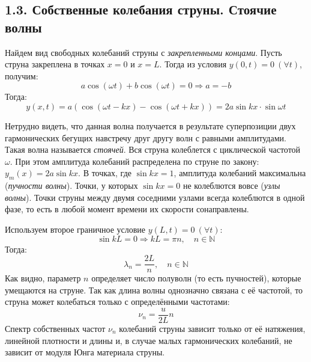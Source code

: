 \documentclass[a4paper]{article}
\begin{document}
\subsection*{1.3. Собственные колебания струны. Стоячие волны} 

\noindent
Найдем вид свободных колебаний струны с \textit{закрепленными концами}. Пусть струна закреплена в точках $x = 0$ и $x = L$. Тогда из условия $y(0, t) = 0 \ (\forall t)$, получим:
\begin{equation}
a \cos(\omega t) + b \cos(\omega t) = 0 \Rightarrow a = -b
\end{equation} 
Тогда:
\begin{equation}\label{eq9}
y(x,t) = a(\cos(\omega t - k x) - \cos(\omega t + k x)) = 2 a \sin{kx} \cdot \sin{\omega t}
\end{equation}

\noindent
Нетрудно видеть, что данная волна получается в результате суперпозиции двух гармонических бегущих навстречу друг другу волн с равными амплитудами. Такая волна называется \textit{стоячей}. Вся струна колеблется с циклической частотой $\omega$. При этом амплитуда колебаний распределена по струне по закону: $y_m(x) = 2 a \sin{kx}$. В точках, где $\sin{kx} = 1$, амплитуда колебаний максимальна (\textit{пучности волны}). Точки, у которых $\sin{kx} = 0$ не колеблются вовсе (\textit{узлы волны}). Точки струны между двумя соседними узлами всегда колеблются в одной фазе, то есть в любой момент времени их скорости сонаправлены.

\noindent
Используем второе граничное условие $y(L, t) = 0 \ (\forall t)$:
\begin{equation}
\sin{kL} = 0 \Rightarrow kL = \pi n, \quad n \in \mathbb {N} 
\end{equation}
Тогда:
\begin{equation}
\lambda_n = \frac{2L}{n}, \quad n \in \mathbb{N}
\end{equation}
Как видно, параметр $n$ определяет число полуволн (то есть пучностей), которые умещаются на струне. Так как длина волны однозначно связана с её частотой, то струна может колебаться только с определёнными частотами:
\begin{equation}\label{eq12}
\nu_n = \frac{u}{2L} n
\end{equation}
Спектр собственных частот $\nu_n$ колебаний струны зависит только от её натяжения, линейной плотности и длины и, в случае малых гармонических колебаний, не зависит от модуля Юнга материала струны.
\end{document}

